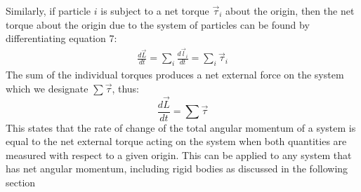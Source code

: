 \documentclass[a4paper]{article}
\newcommand\der[2]{\frac{d #1}{d #2}}
\begin{document}
Similarly, if particle $i$ is subject to a net torque $\vec{\tau}_i$ about the origin, then the net torque about the origin due to the system of particles can be found by differentiating equation 7:
\begin{align*}
    \der{\vec{L}}{t} = \sum_{i}\der{\vec{l}_i}{t} = \sum_{i}\vec{\tau}_i
\end{align*}
The sum of the individual torques produces a net external force on the system which we designate $\sum\vec{\tau}$, thus:
\begin{equation}
    \der{\vec{L}}{t} = \sum\vec{\tau}
\end{equation}
This states that the rate of change of the total angular momentum of a system is equal to the net external torque acting on the system when both quantities are measured with respect to a given origin. This can be applied to any system that has net angular momentum, including rigid bodies as discussed in the following section
\end{document}
